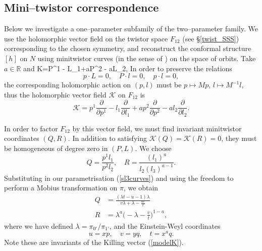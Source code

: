 \subsection{Mini--twistor correspondence}
\label{mini_twistor}
Below we investigate a one--parameter subfamily of the two--parameter family. We use the holomorphic vector field on 
the twistor space
$F_{12}$  (see \S\ref{twist_SSS})
corresponding to the chosen symmetry, and reconstruct the conformal structure $[h]$ on $N$ using minitwistor curves 
(in the sense of \cite{hitchin})
on the space of orbits. Take $a\in \mathbb{R}$ and
\be
\label{modelK}
K=P^1 - L_1+aP^2 - aL_2,
\ee
In order to preserve the relations
\[
p\cdot L=0,\quad P\cdot l=0,\quad p\cdot l=0, 
\]
the corresponding holomorphic action on $(p,l)$ must be $p\mapsto Mp$, $l\mapsto M^{-1}l$, thus the holomorphic vector field $\mathcal{K}$ on $F_{12}$ is
\[
\mathcal{K}=p^1\frac{\partial}{\partial p^1} - l_1\frac{\partial}{\partial l_1}+ap^2\frac{\partial}{\partial p^2} - al_2\frac{\partial}{\partial l_2}.
\]

In order to factor $F_{12}$ by this vector field, we must find invariant minitwistor coordinates $(Q,R)$. In addition to satisfying $\mathcal{K}(Q)=\mathcal{K}(R)=0$, they must be homogeneous of degree zero in $(P,L)$. We choose
\[
Q=\frac{p^1l_1}{p^2l_2},\quad R=\frac{(l_1)^a}{l_2(l_3)^{a-1}}.
\]
Substituting in our parametrisation (\ref{sl3curves}) and using the freedom to perform a Mobius transformation on $\pi$, we obtain
\begin{align}
\label{QR}
Q &= \frac{(\lambda t-u-1)\lambda}{v\lambda+\lambda-\frac{uv}{t}}\\
R &= \lambda^a\Big(-\lambda-\frac{v}{t}\Big)^{1-a},\nonumber
\end{align}
where we have defined $\lambda=\pi_{0'}/\pi_{1'}$, and the Einstein-Weyl coordinates
\[
u=xp,\quad v=yq, \quad t=x^aq.
\]
Note these are invariants of the Killing vector (\ref{modelK}).

